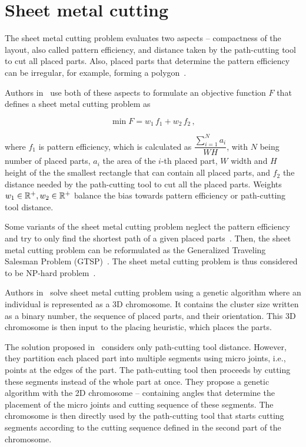 \section{Sheet metal cutting}\label{sec:sheet-metal-cutting}

The sheet metal cutting problem evaluates two aspects – compactness of the layout, also called pattern efficiency, and distance taken
by the path-cutting tool to cut all placed parts.
Also, placed parts that determine the pattern efficiency can be irregular, for example, forming a polygon~\cite{hajadLaserCuttingPath2019}.

Authors in~\cite{vijayanandHeuristicGeneticApproach2015}
use both of these aspects to formulate an objective function $F$ that defines a sheet metal cutting problem as

\begin{equation}
    \min F = w_1\,f_1 + w_2\,f_{2}\,,
    \label{eq:metal-sheet-cutting}
\end{equation}

where $f_1$ is pattern efficiency, which is calculated as $\dfrac{\sum\limits_{i=1}^{N}a_i}{WH}$,
with $N$ being number of placed parts, $a_i$ the area of the $i$-th placed part, $W$ width and $H$ height of the
the smallest rectangle that can contain all placed parts, and $f_2$ the distance
needed by the path-cutting tool to cut all the placed parts.
Weights $w_1 \in \operatorname*{\mathbb{R}^+}, w_2 \in \operatorname*{\mathbb{R}^+}$ balance the bias towards pattern efficiency or path-cutting tool distance.

Some variants of the sheet metal cutting problem neglect the pattern efficiency and try to only find the shortest
path of a given placed parts~\cite{kandasamyEffectiveLocationMicro2020}.
Then, the sheet metal cutting problem can be reformulated as the Generalized Traveling Salesman Problem (GTSP)~\cite{hajadLaserCuttingPath2019}.
The sheet metal cutting problem is thus considered to be NP-hard problem~\cite{vijayanandHeuristicGeneticApproach2015}.

Authors in~\cite{vijayanandHeuristicGeneticApproach2015} solve sheet metal cutting problem using a genetic algorithm
where an individual is represented as a 3D chromosome.
It contains the cluster size written as a binary number, the sequence of placed parts, and their orientation.
This 3D chromosome is then input to the placing heuristic, which places the parts.

The solution proposed in~\cite{kandasamyEffectiveLocationMicro2020} considers only path-cutting tool distance.
However, they partition each placed part into multiple segments using micro joints, i.e., points at the edges of the part.
The path-cutting tool then proceeds by cutting these segments instead of the whole part at once.
They propose a genetic algorithm with the 2D chromosome – containing angles that determine the placement of the micro joints and cutting sequence of these segments.
The chromosome is then directly used by the path-cutting tool that starts cutting segments according to the cutting sequence defined in the second part of the chromosome.